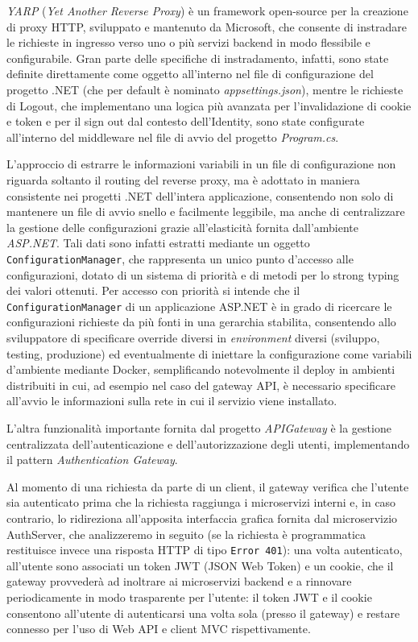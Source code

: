 \emph{YARP} (\emph{Yet Another Reverse Proxy}) è un framework open-source per la creazione di proxy HTTP, sviluppato e mantenuto da Microsoft, che consente di instradare le richieste in ingresso verso uno o più servizi backend in modo flessibile e configurabile. Gran parte delle specifiche di instradamento, infatti, sono state definite direttamente come oggetto all'interno nel file di configurazione del progetto .NET (che per default è nominato \emph{appsettings.json}), mentre le richieste di Logout, che implementano una logica più avanzata per l'invalidazione di cookie e token e per il sign out dal contesto dell'Identity, sono state configurate all'interno del middleware nel file di avvio del progetto \emph{Program.cs}.

L'approccio di estrarre le informazioni variabili in un file di configurazione non riguarda soltanto il routing del reverse proxy, ma è adottato in maniera consistente nei progetti .NET dell'intera applicazione, consentendo non solo di mantenere un file di avvio snello e facilmente leggibile, ma anche di centralizzare la gestione delle configurazioni grazie all'elasticità fornita dall'ambiente \emph{ASP.NET}.
Tali dati sono infatti estratti mediante un oggetto \texttt{ConfigurationManager}, che rappresenta un unico punto d'accesso alle configurazioni, dotato di un sistema di priorità e di metodi per lo strong typing dei valori ottenuti. Per accesso con priorità si intende che il \texttt{ConfigurationManager} di un applicazione ASP.NET è in grado di ricercare le configurazioni richieste da più fonti in una gerarchia stabilita, consentendo allo sviluppatore di specificare override diversi in \emph{environment} diversi (sviluppo, testing, produzione) ed eventualmente di iniettare la configurazione come variabili d'ambiente mediante Docker, semplificando notevolmente il deploy in ambienti distribuiti in cui, ad esempio nel caso del gateway API, è necessario specificare all'avvio le informazioni sulla rete in cui il servizio viene installato.

L'altra funzionalità importante fornita dal progetto \emph{APIGateway} è la gestione centralizzata dell'autenticazione e dell'autorizzazione degli utenti, implementando il pattern \emph{Authentication Gateway}.

Al momento di una richiesta da parte di un client, il gateway verifica che l'utente sia autenticato prima che la richiesta raggiunga i microservizi interni e, in caso contrario, lo ridireziona all'apposita interfaccia grafica fornita dal microservizio AuthServer, che analizzeremo in seguito (se la richiesta è programmatica restituisce invece una risposta HTTP di tipo \texttt{Error 401}): una volta autenticato, all'utente sono associati un token JWT (JSON Web Token) e un cookie, che il gateway provvederà ad inoltrare ai microservizi backend e a rinnovare periodicamente in modo trasparente per l'utente: il token JWT e il cookie consentono all'utente di autenticarsi una volta sola (presso il gateway) e restare connesso per l'uso di Web API e client MVC rispettivamente.

